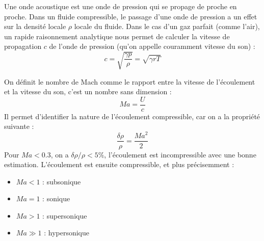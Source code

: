 
Une onde acoustique est une onde de pression qui se propage de proche en proche. Dans un fluide compressible, le passage d'une onde de pression a un effet sur la densité locale $\rho$ locale du fluide. Dans le cas d'un gaz parfait (comme l'air), un rapide raisonnement analytique nous permet de calculer la vitesse de propagation $c$ de l'onde de pression (qu'on appelle couramment vitesse du son) :
%
\begin{equation}
    c = \sqrt{\frac{\gamma p}{\rho}} = \sqrt{\gamma r T}
\end{equation}

On définit le nombre de Mach comme le rapport entre la vitesse de l'écoulement et la vitesse du son, c'est un nombre sans dimension :
%
\begin{equation}
    Ma = \frac{U}{c}
\end{equation}
%
Il permet d'identifier la nature de l'écoulement compressible, car on a la propriété suivante :
%
\begin{equation}
    \frac{\delta \rho}{\rho} = \frac{{Ma}^2}{2}
\end{equation}
%
Pour $Ma < 0.3$, on a $\delta \rho / \rho < 5\%$, l'écoulement est incompressible avec une bonne estimation. L'écoulement est ensuite compressible, et plus précisemment :
\begin{itemize}
    \item $Ma < 1$ : subsonique
    \item $Ma = 1$ : sonique
    \item $Ma > 1$ : supersonique
    \item $Ma \gg 1$ : hypersonique
\end{itemize}

